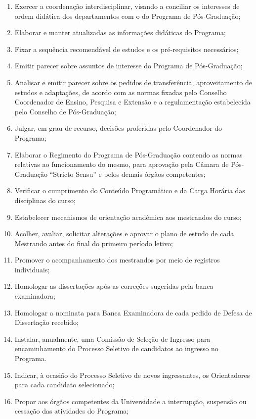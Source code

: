 \documentclass{article}
\begin{document}
\begin{enumerate}
\begin{enumerate}
		\item Exercer a coordenação interdisciplinar, visando a conciliar os interesses de ordem didática dos departamentos com o do Programa de Pós-Graduação;	%
		\item Elaborar e manter atualizadas as informações didáticas do Programa;
		\item Fixar a sequência recomendável de estudos e os pré-requisitos necessários;
		\item Emitir parecer sobre assuntos de interesse do Programa de Pós-Graduação;
		\item Analisar e emitir parecer sobre os pedidos de transferência, aproveitamento de estudos e adaptações, de acordo com as normas fixadas pelo Conselho Coordenador de Ensino, Pesquisa e Extensão e a regulamentação estabelecida pelo Conselho de Pós-Graduação;
		\item Julgar, em grau de recurso, decisões proferidas pelo Coordenador do Programa;
		\item Elaborar o Regimento do Programa de Pós-Graduação contendo as normas relativas ao funcionamento do mesmo, para aprovação pela Câmara de Pós-Graduação ``Stricto Sensu'' e pelos demais órgãos competentes;
		\item Verificar o cumprimento do Conteúdo Programático e da Carga Horária das disciplinas do curso; %
		\item Estabelecer mecanismos de orientação acadêmica aos mestrandos do curso;
		\item Acolher, avaliar, solicitar alterações e aprovar o plano de estudo de cada Mestrando antes do final do primeiro período letivo; %
		\item Promover o acompanhamento dos mestrandos por meio de registros individuais;
		\item Homologar as dissertações após as correções sugeridas pela banca examinadora;
		\item Homologar a nominata para Banca Examinadora de cada pedido de Defesa de Dissertação recebido;
		\item Instalar, anualmente, uma Comissão de Seleção de Ingresso para encaminhamento do Processo Seletivo de candidatos ao ingresso no Programa.
		\item Indicar, à ocasião do Processo Seletivo de novos ingressantes, os Orientadores para cada candidato selecionado; %
		\item Propor aos órgãos competentes da Universidade a interrupção, suspensão ou cessação das atividades do Programa;

\end{enumerate}
\end{enumerate}
\end{document}

